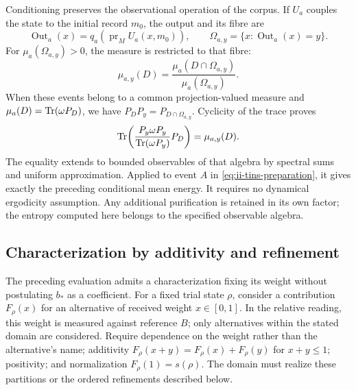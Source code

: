 Conditioning preserves the observational operation of the corpus. If
$U_a$ couples the state to the initial record $m_0$, the output and its
fibre are
\[
 \operatorname{Out}_a(x)=q_a(\operatorname{pr}_M U_a(x,m_0)),\qquad
 \Omega_{a,y}=\{x:\operatorname{Out}_a(x)=y\}.
\]
For $\mu_a(\Omega_{a,y})>0$, the measure is restricted to that fibre:
\begin{equation}
 \mu_{a,y}(D)=\frac{\mu_a(D\cap\Omega_{a,y})}{\mu_a(\Omega_{a,y})}.
 \label{eq:ii-tins-fiber}
\end{equation}
When these events belong to a common projection-valued measure and
$\mu_a(D)=\operatorname{Tr}(\omega P_D)$, we have
$P_DP_y=P_{D\cap\Omega_{a,y}}$. Cyclicity of the trace proves
\[
 \operatorname{Tr}\!\left(\frac{P_y\omega P_y}{\operatorname{Tr}(\omega P_y)}P_D\right)
 =\mu_{a,y}(D).
\]
The equality extends to bounded observables of that algebra by spectral
sums and uniform approximation. Applied to event $A$ in
\eqref{eq:ii-tins-preparation}, it gives exactly the preceding conditional
mean energy. It requires no dynamical ergodicity assumption. Any additional
purification is retained in its own factor; the entropy computed here
belongs to the specified observable algebra.

\subsection{Characterization by additivity and refinement}
\label{subsec:ii-tins-aditividad}

The preceding evaluation admits a characterization fixing its weight
without postulating $b_*$ as a coefficient. For a fixed trial state $\rho$,
consider a contribution $F_\rho(x)$ for an alternative of received weight
$x\in[0,1]$. In the relative reading, this weight is measured against
reference $B$; only alternatives within the stated domain are considered.
Require dependence on the weight rather than the alternative's name;
additivity $F_\rho(x+y)=F_\rho(x)+F_\rho(y)$ for $x+y\le1$;
positivity; and normalization $F_\rho(1)=s(\rho)$. The domain must
realize these partitions or the ordered refinements described below.

